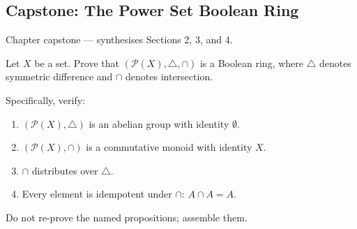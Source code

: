 
\subsection*{Capstone: The Power Set Boolean Ring}
\clearpage
\label{prf:capstone-algebras-of-sets}

\begin{remark*}[Return]
Chapter capstone --- synthesises Sections 2, 3, and 4.
\end{remark*}

\begin{remark*}
Let $X$ be a set. Prove that $(\mathcal{P}(X), \mathbin{\triangle}, \cap)$
is a Boolean ring, where $\triangle$ denotes symmetric difference and $\cap$
denotes intersection.

Specifically, verify:
\begin{enumerate}[label=(\roman*)]
  \item $(\mathcal{P}(X), \triangle)$ is an abelian group with
        identity $\emptyset$.
  \item $(\mathcal{P}(X), \cap)$ is a commutative monoid with
        identity $X$.
  \item $\cap$ distributes over $\triangle$.
  \item Every element is idempotent under $\cap$: $A \cap A = A$.
\end{enumerate}

Do not re-prove the named propositions; assemble them.
\end{remark*}

